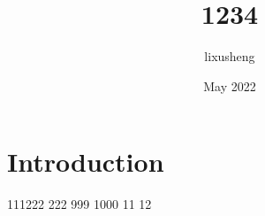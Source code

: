 \documentclass{article}
\title{1234}
\author{lixusheng }
\date{May 2022}
\begin{document}
\maketitle

\section{Introduction}
111222
222
999
1000
11
12
\end{document}
